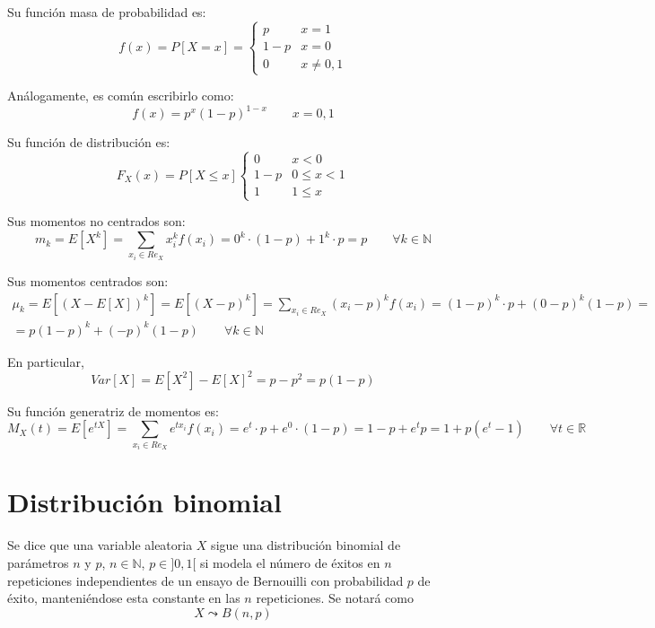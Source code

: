 Su función masa de probabilidad es:
\begin{equation*}
    f(x) = P[X=x] = \left\{\begin{array}{cc}
        p & x=1 \\
        1-p & x=0 \\
        0 & x\neq 0,1
    \end{array}\right.
\end{equation*}

Análogamente, es común escribirlo como:
$$f(x)=p^x (1-p)^{1-x} \qquad x=0,1$$

Su función de distribución es:
\begin{equation*}
    F_X(x) = P[X\leq x] \left\{\begin{array}{cl}
        0 & x<0 \\
        1-p & 0 \leq x < 1 \\
        1 & 1 \leq x
    \end{array}\right.
\end{equation*}

Sus momentos no centrados son:
\begin{equation*}
    m_k = E[X^k]
    = \sum_{x_i\in Re_X}x_i^kf(x_i)
    = 0^k\cdot (1-p) + 1^k\cdot p = p
    \qquad \forall k\in \mathbb{N}
\end{equation*}

Sus momentos centrados son:
\begin{multline*}
    \mu_k = E[(X-E[X])^k]
    = E[(X-p)^k]
    = \sum_{x_i\in Re_X}(x_i-p)^k   f(x_i)
    = (1-p)^k\cdot p + (0-p)^k(1-p) =\\=
    p(1-p)^k + (-p)^k(1-p)    
    \qquad \forall k\in \mathbb{N}
\end{multline*}

En particular,
\begin{equation*}
    Var[X] = E[X^2] - E[X]^2 = p-p^2 = p(1-p)
\end{equation*}

Su función generatriz de momentos es:
\begin{equation*}
    M_X(t) = E[e^{tX}] = \sum_{x_i\in Re_X}e^{tx_i}f(x_i) = e^t\cdot p + e^0\cdot (1-p) = 1-p +e^tp = 1+p(e^t-1)     
    \qquad \forall t\in \mathbb{R}
\end{equation*}

\section{Distribución binomial}
\begin{definicion}
    Se dice que una variable aleatoria $X$ sigue una distribución binomial de parámetros $n$ y $p$, $n\in \mathbb{N}$, $p\in ]0,1[$ si modela el número de éxitos en $n$ repeticiones independientes de un ensayo de Bernouilli con probabilidad $p$ de éxito, manteniéndose esta constante en las $n$ repeticiones. Se notará como $$X\leadsto B(n,p)$$
\end{definicion}

